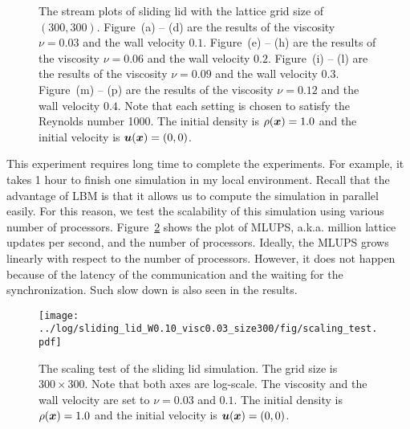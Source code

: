 \begin{figure}[tb]
\begin{center}
    \caption{The stream plots of sliding lid
    with the lattice grid size of $(300, 300)$.
    Figure~(a) -- (d) are the results of 
    the viscosity $\nu = 0.03$ and the wall velocity $0.1$.
    Figure~(e) -- (h) are the results of 
    the viscosity $\nu = 0.06$ and the wall velocity $0.2$.
    Figure~(i) -- (l) are the results of 
    the viscosity $\nu = 0.09$ and the wall velocity $0.3$.
    Figure~(m) -- (p) are the results of 
    the viscosity $\nu = 0.12$ and the wall velocity $0.4$.
    Note that each setting is chosen to satisfy
    the Reynolds number 1000.
    The initial density is $\rho(\boldsymbol{x}) = 1.0$ and the initial velocity is $\boldsymbol{u}(\boldsymbol{x}) = (0, 0)$.
      \label{fig:sliding-lid-velocity-evolution}}
  \end{center}
\end{figure}

This experiment requires long time to complete the experiments.
For example, it takes 1 hour to finish one simulation in my local environment.
Recall that the advantage of LBM is that it allows us to compute the simulation in
parallel easily.
For this reason, we test the scalability of this simulation using
various number of processors.
Figure~\ref{fig:sliding-lid-scaling} shows the plot of
MLUPS, a.k.a. million lattice updates per second, and
the number of processors.
Ideally, the MLUPS grows linearly with respect to the number of processors.
However, it does not happen because of the latency of the communication
and the waiting for the synchronization.
Such slow down is also seen in the results.

\begin{figure}
  \centering
  \texttt{[image: ../log/sliding\_lid\_W0.10\_visc0.03\_size300/fig/scaling\_test.pdf]}
  \caption{The scaling test of the sliding lid simulation.
  The grid size is $300 \times 300$.
  Note that both axes are log-scale.
    The viscosity and the wall velocity are set to $\nu = 0.03$ and $0.1$.
    The initial density is $\rho(\boldsymbol{x}) = 1.0$ and the initial velocity is $\boldsymbol{u}(\boldsymbol{x}) = (0, 0)$.
  }
  \label{fig:sliding-lid-scaling}
\end{figure}

